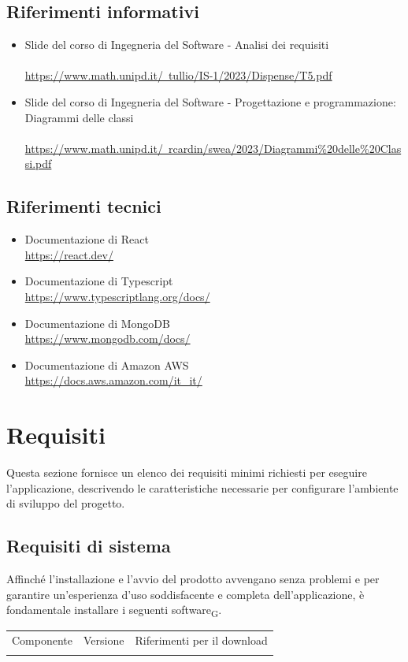 \documentclass{article}
\begin{document}
{\subsection{Riferimenti informativi}
\begin{itemize}
    \item Slide del corso di Ingegneria del Software - Analisi dei requisiti \\ \\
    \href{https://www.math.unipd.it/~tullio/IS-1/2023/Dispense/T5.pdf}{https://www.math.unipd.it/~tullio/IS-1/2023/Dispense/T5.pdf}
    \item Slide del corso di Ingegneria del Software - Progettazione e programmazione: Diagrammi delle classi \\ \\
\href{https://www.math.unipd.it/~rcardin/swea/2023/Diagrammi%20delle%20Classi.pdf}{https://www.math.unipd.it/~rcardin/swea/2023/Diagrammi\%20delle\%20Classi.pdf}
\end{itemize}
\subsection{Riferimenti tecnici}
\begin{itemize}
\item Documentazione di React \\ \href{ https://react.dev/}{ https://react.dev/}
\item Documentazione di Typescript \\ \href{https://www.typescriptlang.org/docs/}{https://www.typescriptlang.org/docs/}
\item Documentazione di MongoDB \\ \href{https://www.mongodb.com/docs/}{https://www.mongodb.com/docs/}
\item Documentazione di Amazon AWS \\ \href{https://docs.aws.amazon.com/it_it/}{https://docs.aws.amazon.com/it\_it/}
\end{itemize}

\section{Requisiti}
Questa sezione fornisce un elenco dei requisiti minimi richiesti per eseguire l'applicazione, descrivendo le caratteristiche necessarie per configurare l'ambiente di sviluppo del progetto.
\subsection{Requisiti di sistema}
Affinché l'installazione e l'avvio del prodotto avvengano senza problemi e per garantire un'esperienza d'uso soddisfacente e completa dell'applicazione, è fondamentale installare i seguenti software\textsubscript{G}.
\begin{center}
\begin{tabular}{c|c|c}
\hline
\rowcolor{Blue}
Componente & Versione & Riferimenti per il download \\
\rowcolor{LighterBlue}


\end{tabular}
\end{center}}
\end{document}
